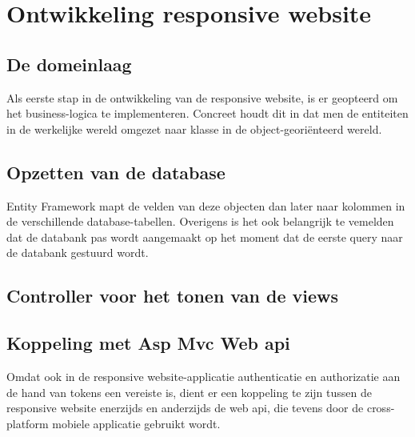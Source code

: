 \chapter{Ontwikkeling responsive website}
\label{ch:ontwikkelingresponsivewebsite}
\section{De domeinlaag}
Als eerste stap in de ontwikkeling van de responsive website, is er geopteerd om het business-logica te implementeren.
Concreet houdt dit in dat men de entiteiten in de werkelijke wereld omgezet naar klasse in de object-georiënteerd wereld.

\section{Opzetten van de database}
Entity Framework mapt de velden van deze objecten dan later naar kolommen in de verschillende database-tabellen. Overigens is het
ook belangrijk te vemelden dat de databank pas wordt aangemaakt op het moment dat de eerste query naar de databank gestuurd wordt.

\section{Controller voor het tonen van de views}


\section{Koppeling met Asp Mvc Web api}
Omdat ook in de responsive website-applicatie authenticatie en authorizatie aan de hand van tokens een vereiste is,
dient er een koppeling te zijn tussen de responsive website enerzijds en anderzijds de web api, die tevens door de cross-platform
mobiele applicatie gebruikt wordt.

\
